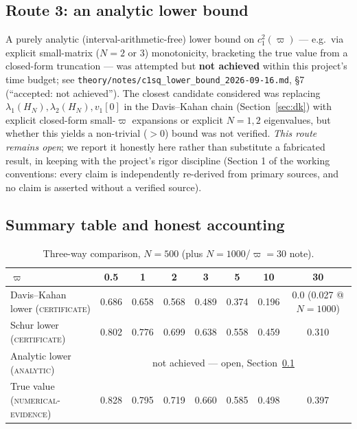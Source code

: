 \documentclass[11pt]{article}
\begin{document}
\subsection{Route 3: an analytic lower bound}\label{sec:analytic-c1sq}

A purely analytic (interval-arithmetic-free) lower bound on $c_1^2(\varpi)$
--- e.g.\ via explicit small-matrix ($N=2$ or $3$) monotonicity, bracketing
the true value from a closed-form truncation --- was attempted but
\textbf{not achieved} within this project's time budget; see
\texttt{theory/notes/c1sq\_lower\_bound\_2026-09-16.md}, \S7 (``accepted:
not achieved''). The closest candidate considered was replacing
$\lambda_1(H_N),\lambda_2(H_N),v_1[0]$ in the Davis--Kahan chain
(Section~\ref{sec:dk}) with explicit closed-form small-$\varpi$
expansions or explicit $N=1,2$ eigenvalues, but whether this yields a
non-trivial ($>0$) bound was not verified. \emph{This route remains open};
we report it honestly here rather than substitute a fabricated result, in
keeping with the project's rigor discipline (Section 1 of the working
conventions: every claim is independently re-derived from primary sources,
and no claim is asserted without a verified source).

\subsection{Summary table and honest accounting}

\begin{table}[h]
\centering
\caption{Three-way comparison, $N=500$ (plus $N=1000$/$\varpi=30$ note).}
\label{tab:c1sq-summary}
\begin{tabular}{lccccccc}
\toprule
$\varpi$ & 0.5 & 1 & 2 & 3 & 5 & 10 & 30\\
\midrule
Davis--Kahan lower (\textsc{certificate}) & 0.686 & 0.658 & 0.568 & 0.489 & 0.374 & 0.196 & 0.0 (0.027 @ $N{=}1000$)\\
Schur lower (\textsc{certificate}) & 0.802 & 0.776 & 0.699 & 0.638 & 0.558 & 0.459 & 0.310\\
Analytic lower (\textsc{analytic}) & \multicolumn{7}{c}{not achieved --- open, Section~\ref{sec:analytic-c1sq}}\\
True value (\textsc{numerical-evidence}) & 0.828 & 0.795 & 0.719 & 0.660 & 0.585 & 0.498 & 0.397\\
\bottomrule
\end{tabular}
\end{table}
\end{document}
